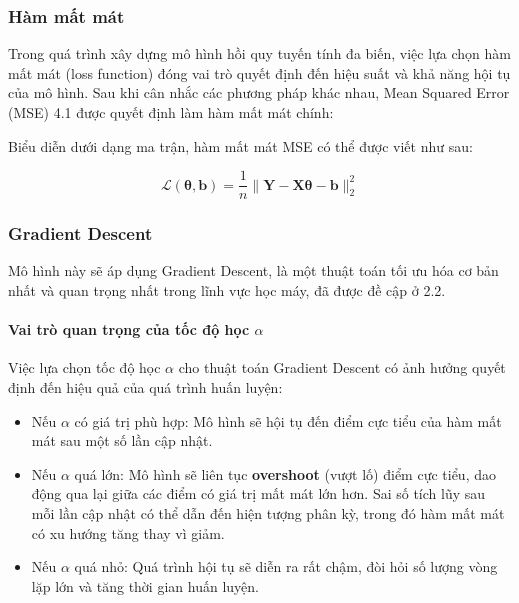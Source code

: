 \subsubsection{Hàm mất mát}

Trong quá trình xây dựng mô hình hồi quy tuyến tính đa biến, việc lựa chọn hàm mất mát (loss function) đóng vai trò quyết định đến hiệu suất và khả năng hội tụ của mô hình. Sau khi cân nhắc các phương pháp khác nhau, Mean Squared Error (MSE) 4.1 được quyết định làm hàm mất mát chính:

Biểu diễn dưới dạng ma trận, hàm mất mát MSE có thể được viết như sau:

\[
   \mathcal{L}(\boldsymbol{\theta}, \boldsymbol{b}) = \frac{1}{n} \|\mathbf{Y} - \mathbf{X}\boldsymbol{\theta} - \mathbf{b}\|_2^2
\]

\subsubsection{Gradient Descent}

Mô hình này sẽ áp dụng Gradient Descent, là một thuật toán tối ưu hóa cơ bản nhất và quan trọng nhất trong lĩnh vực học máy, đã được đề cập ở 2.2. 

\paragraph{Vai trò quan trọng của tốc độ học $\alpha$} Việc lựa chọn tốc độ học $\alpha$ cho thuật toán Gradient Descent có ảnh hưởng quyết định đến hiệu quả của quá trình huấn luyện:

\begin{itemize}
    \item Nếu $\alpha$ có giá trị phù hợp: Mô hình sẽ hội tụ đến điểm cực tiểu của hàm mất mát sau một số lần cập nhật.
    
    \item Nếu $\alpha$ quá lớn: Mô hình sẽ liên tục \textbf{overshoot} (vượt lố) điểm cực tiểu, dao động qua lại giữa các điểm có giá trị mất mát lớn hơn. Sai số tích lũy sau mỗi lần cập nhật có thể dẫn đến hiện tượng phân kỳ, trong đó hàm mất mát có xu hướng tăng thay vì giảm.
    
    \item Nếu $\alpha$ quá nhỏ: Quá trình hội tụ sẽ diễn ra rất chậm, đòi hỏi số lượng vòng lặp lớn và tăng thời gian huấn luyện.
\end{itemize}

